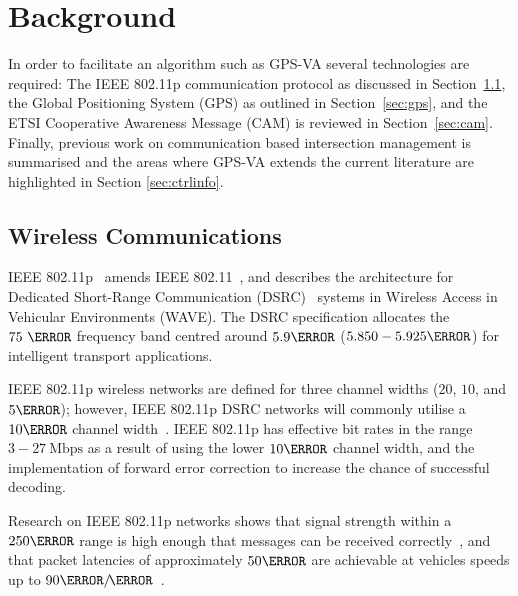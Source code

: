 \documentclass[numbered]{trbunofficial}
\newcommand{\sidiv}{/\hspace{-1.5pt}} %
\begin{document}
\section{Background}\label{sec:bg}
In order to facilitate an algorithm such as GPS-VA several technologies are required: The IEEE 802.11p communication protocol as discussed in Section~\ref{sec:wicomm}, the Global Positioning System (GPS) as outlined in Section~\ref{sec:gps}, and the ETSI Cooperative Awareness Message (CAM) is reviewed in Section~\ref{sec:cam}. Finally, previous work on communication based intersection management is summarised and the areas where GPS-VA extends the current literature are highlighted in Section \ref{sec:ctrlinfo}.

\subsection{Wireless Communications}\label{sec:wicomm}
IEEE 802.11p~\cite{ieee80211p} amends IEEE 802.11~\cite{ieee80211}, and describes the architecture for Dedicated Short-Range Communication (DSRC)~\cite{FCCDSRC03} systems in Wireless Access in Vehicular Environments (WAVE)\cite{ieee16090wave}. The DSRC specification allocates the $75\ \MHz$ frequency band centred around $5.9\GHz$ ($5.850-5.925\GHz$) for intelligent transport applications.

IEEE 802.11p wireless networks are defined for three channel widths ($20$, $10$, and $5\MHz$); however, IEEE 802.11p DSRC networks will commonly utilise a $10\MHz$ channel width~\cite{kenney11}. IEEE 802.11p
has effective bit rates in the range $3-27\ \text{Mbps}$ as a result of using the lower $10\MHz$ channel width, and the implementation of forward error correction to increase the chance of successful decoding.

Research on IEEE 802.11p networks shows that signal strength within a $250\m$ range is high enough that messages can be received correctly~\cite{msadaa2010, hameedmir2014}, and that packet latencies of approximately $50\ms$ are achievable at vehicles speeds up to $90\km\sidiv\hour$~\cite{msadaa2010}.
\end{document}
